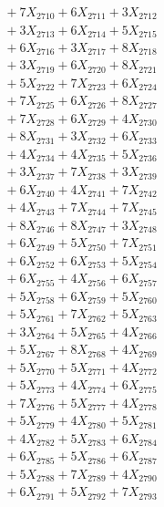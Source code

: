 \documentclass[a4paper,10pt]{article}
\begin{document}
{\begin{align}
&\;  + 7 X_{2710} + 6 X_{2711} + 3 X_{2712} \\[0.3ex]
&\;  + 3 X_{2713} + 6 X_{2714} + 5 X_{2715} \\[0.3ex]
&\;  + 6 X_{2716} + 3 X_{2717} + 8 X_{2718} \\[0.3ex]
&\;  + 3 X_{2719} + 6 X_{2720} + 8 X_{2721} \\[0.3ex]
&\;  + 5 X_{2722} + 7 X_{2723} + 6 X_{2724} \\[0.3ex]
&\;  + 7 X_{2725} + 6 X_{2726} + 8 X_{2727} \\[0.3ex]
&\;  + 7 X_{2728} + 6 X_{2729} + 4 X_{2730} \\[0.3ex]
&\;  + 8 X_{2731} + 3 X_{2732} + 6 X_{2733} \\[0.3ex]
&\;  + 4 X_{2734} + 4 X_{2735} + 5 X_{2736} \\[0.3ex]
&\;  + 3 X_{2737} + 7 X_{2738} + 3 X_{2739} \\[0.5ex]\allowbreak
&\;  + 6 X_{2740} + 4 X_{2741} + 7 X_{2742} \\[0.3ex]
&\;  + 4 X_{2743} + 7 X_{2744} + 7 X_{2745} \\[0.3ex]
&\;  + 8 X_{2746} + 8 X_{2747} + 3 X_{2748} \\[0.3ex]
&\;  + 6 X_{2749} + 5 X_{2750} + 7 X_{2751} \\[0.3ex]
&\;  + 6 X_{2752} + 6 X_{2753} + 5 X_{2754} \\[0.3ex]
&\;  + 6 X_{2755} + 4 X_{2756} + 6 X_{2757} \\[0.3ex]
&\;  + 5 X_{2758} + 6 X_{2759} + 5 X_{2760} \\[0.3ex]
&\;  + 5 X_{2761} + 7 X_{2762} + 5 X_{2763} \\[0.3ex]
&\;  + 3 X_{2764} + 5 X_{2765} + 4 X_{2766} \\[0.3ex]
&\;  + 5 X_{2767} + 8 X_{2768} + 4 X_{2769} \\[0.5ex]\allowbreak
&\;  + 5 X_{2770} + 5 X_{2771} + 4 X_{2772} \\[0.3ex]
&\;  + 5 X_{2773} + 4 X_{2774} + 6 X_{2775} \\[0.3ex]
&\;  + 7 X_{2776} + 5 X_{2777} + 4 X_{2778} \\[0.3ex]
&\;  + 5 X_{2779} + 4 X_{2780} + 5 X_{2781} \\[0.3ex]
&\;  + 4 X_{2782} + 5 X_{2783} + 6 X_{2784} \\[0.3ex]
&\;  + 6 X_{2785} + 5 X_{2786} + 6 X_{2787} \\[0.3ex]
&\;  + 5 X_{2788} + 7 X_{2789} + 4 X_{2790} \\[0.3ex]
&\;  + 6 X_{2791} + 5 X_{2792} + 7 X_{2793} \\[0.3ex]

\end{align}}
\end{document}
